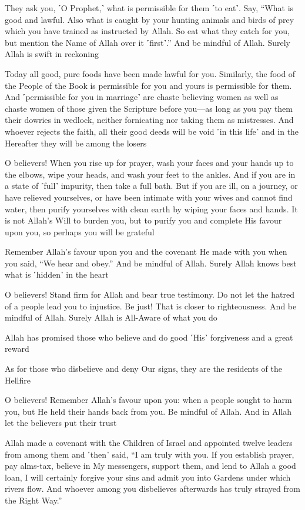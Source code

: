 They ask you, ˹O Prophet,˺ what is permissible for them ˹to eat˺. Say, “What is good and lawful. Also what is caught by your hunting animals and birds of prey which you have trained as instructed by Allah. So eat what they catch for you, but mention the Name of Allah over it ˹first˺.” And be mindful of Allah. Surely Allah is swift in reckoning

Today all good, pure foods have been made lawful for you. Similarly, the food of the People of the Book is permissible for you and yours is permissible for them. And ˹permissible for you in marriage˺ are chaste believing women as well as chaste women of those given the Scripture before you—as long as you pay them their dowries in wedlock, neither fornicating nor taking them as mistresses. And whoever rejects the faith, all their good deeds will be void ˹in this life˺ and in the Hereafter they will be among the losers

O believers! When you rise up for prayer, wash your faces and your hands up to the elbows, wipe your heads, and wash your feet to the ankles. And if you are in a state of ˹full˺ impurity, then take a full bath. But if you are ill, on a journey, or have relieved yourselves, or have been intimate with your wives and cannot find water, then purify yourselves with clean earth by wiping your faces and hands. It is not Allah’s Will to burden you, but to purify you and complete His favour upon you, so perhaps you will be grateful

Remember Allah’s favour upon you and the covenant He made with you when you said, “We hear and obey.” And be mindful of Allah. Surely Allah knows best what is ˹hidden˺ in the heart

O believers! Stand firm for Allah and bear true testimony. Do not let the hatred of a people lead you to injustice. Be just! That is closer to righteousness. And be mindful of Allah. Surely Allah is All-Aware of what you do

Allah has promised those who believe and do good ˹His˺ forgiveness and a great reward

As for those who disbelieve and deny Our signs, they are the residents of the Hellfire

O believers! Remember Allah’s favour upon you: when a people sought to harm you, but He held their hands back from you. Be mindful of Allah. And in Allah let the believers put their trust

Allah made a covenant with the Children of Israel and appointed twelve leaders from among them and ˹then˺ said, “I am truly with you. If you establish prayer, pay alms-tax, believe in My messengers, support them, and lend to Allah a good loan, I will certainly forgive your sins and admit you into Gardens under which rivers flow. And whoever among you disbelieves afterwards has truly strayed from the Right Way.”

